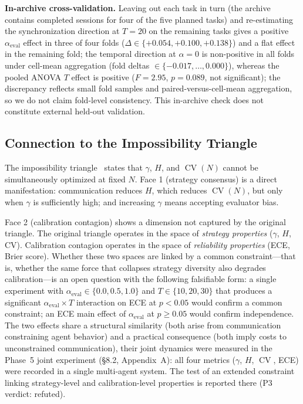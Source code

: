 \documentclass[11pt]{article}
\DeclareMathOperator{\CV}{CV}
\begin{document}
\noindent\textbf{In-archive cross-validation.} Leaving out each task in turn (the archive contains completed sessions for four of the five planned tasks) and re-estimating the synchronization direction at $T{=}20$ on the remaining tasks gives a positive $\alpha_{\text{eval}}$ effect in three of four folds ($\Delta \in \{+0.054, +0.100, +0.138\}$) and a flat effect in the remaining fold; the temporal direction at $\alpha{=}0$ is non-positive in all folds under cell-mean aggregation (fold deltas $\in \{-0.017, \ldots, 0.000\}$), whereas the pooled ANOVA $T$ effect is positive ($F=2.95$, $p=0.089$, not significant); the discrepancy reflects small fold samples and paired-versus-cell-mean aggregation, so we do not claim fold-level consistency. This in-archive check does not constitute external held-out validation.

\subsection{Connection to the Impossibility Triangle}

The impossibility triangle~\cite{impossible2026} states that $\gamma$, $H$, and $\CV(N)$ cannot be simultaneously optimized at fixed $N$. Face 1 (strategy consensus) is a direct manifestation: communication reduces $H$, which reduces $\CV(N)$, but only when $\gamma$ is sufficiently high; and increasing $\gamma$ means accepting evaluator bias.

Face 2 (calibration contagion) shows a dimension not captured by the original triangle. The original triangle operates in the space of \textit{strategy properties} ($\gamma$, $H$, CV). Calibration contagion operates in the space of \textit{reliability properties} (ECE, Brier score). Whether these two spaces are linked by a common constraint---that is, whether the same force that collapses strategy diversity also degrades calibration---is an open question with the following falsifiable form: a single experiment with $\alpha_{\text{eval}} \in \{0.0, 0.5, 1.0\}$ and $T \in \{10, 20, 30\}$ that produces a significant $\alpha_{\text{eval}} \times T$ interaction on ECE at $p < 0.05$ would confirm a common constraint; an ECE main effect of $\alpha_{\text{eval}}$ at $p \geq 0.05$ would confirm independence. The two effects share a structural similarity (both arise from communication constraining agent behavior) and a practical consequence (both imply costs to unconstrained communication), their joint dynamics were measured in the Phase~5 joint experiment (§8.2, Appendix~A): all four metrics ($\gamma$, $H$, $\CV$, ECE) were recorded in a single multi-agent system. The test of an extended constraint linking strategy-level and calibration-level properties is reported there (P3 verdict: refuted).
\end{document}

